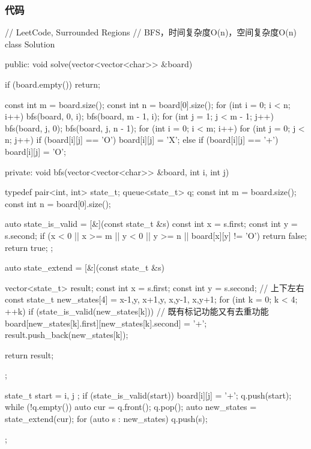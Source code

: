 \subsubsection{代码}
\begin{Code}
// LeetCode, Surrounded Regions
// BFS，时间复杂度O(n)，空间复杂度O(n)
class Solution {
public:
    void solve(vector<vector<char>> &board) {
        if (board.empty()) return;

        const int m = board.size();
        const int n = board[0].size();
        for (int i = 0; i < n; i++) {
            bfs(board, 0, i);
            bfs(board, m - 1, i);
        }
        for (int j = 1; j < m - 1; j++) {
            bfs(board, j, 0);
            bfs(board, j, n - 1);
        }
        for (int i = 0; i < m; i++)
            for (int j = 0; j < n; j++)
                if (board[i][j] == 'O')
                    board[i][j] = 'X';
                else if (board[i][j] == '+')
                    board[i][j] = 'O';
    }
private:
    void bfs(vector<vector<char>> &board, int i, int j) {
        typedef pair<int, int> state_t;
        queue<state_t> q;
        const int m = board.size();
        const int n = board[0].size();

        auto state_is_valid = [&](const state_t &s) {
            const int x = s.first;
            const int y = s.second;
            if (x < 0 || x >= m || y < 0 || y >= n || board[x][y] != 'O')
                return false;
            return true;
        };

        auto state_extend = [&](const state_t &s) {
            vector<state_t> result;
            const int x = s.first;
            const int y = s.second;
            // 上下左右
            const state_t new_states[4] = {{x-1,y}, {x+1,y},
                    {x,y-1}, {x,y+1}};
            for (int k = 0; k < 4;  ++k) {
                if (state_is_valid(new_states[k])) {
                    // 既有标记功能又有去重功能
                    board[new_states[k].first][new_states[k].second] = '+';
                    result.push_back(new_states[k]);
                }
            }

            return result;
        };

        state_t start = { i, j };
        if (state_is_valid(start)) {
            board[i][j] = '+';
            q.push(start);
        }
        while (!q.empty()) {
            auto cur = q.front();
            q.pop();
            auto new_states = state_extend(cur);
            for (auto s : new_states) q.push(s);
        }
    }
};
\end{Code}


